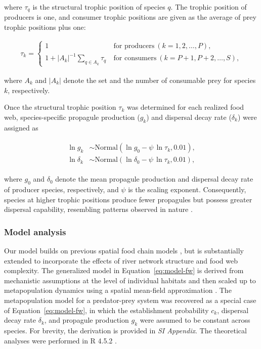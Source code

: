 \documentclass[11pt, class=article, crop=false]{standalone}
\theoremstyle{definition}
\begin{document}
where $\tau_q$ is the structural trophic position of species $q$.
The trophic position of producers is one, and
consumer trophic positions are given as the average of prey trophic positions plus one:

\begin{align}
    \tau_k = 
    \begin{cases}
    1 & ~\text{for producers}~ (k=1, 2, \ldots, P),\\
    1 + |A_{k}|^{-1} \sum_{q \in A_{k}} \tau_q & ~\text{for consumers}~ (k = P+1, P+2, \ldots, S),
    \end{cases}
\end{align}

where $A_{k}$ and $|A_{k}|$ denote the set and the number of consumable prey for species $k$, respectively.

Once the structural trophic position $\tau_k$ was determined for each realized food web, species-specific propagule production ($g_k$) and dispersal decay rate ($\delta_k$) were assigned as

\begin{align}
\begin{split}
    \ln g_k &\sim \mathrm{Normal}(\ln g_0 - \psi\, \ln \tau_k, 0.01),\\
    \ln \delta_k &\sim \mathrm{Normal}(\ln \delta_0 - \psi\,\ln \tau_k, 0.01),
\end{split}
\end{align}

where $g_0$ and $\delta_0$ denote the mean propagule production and dispersal decay rate of producer species, respectively, and $\psi$ is the scaling exponent.
Consequently, species at higher trophic positions produce fewer propagules but possess greater dispersal capability, resembling patterns observed in nature \citep{finlay_stream_2011, mccann_dynamics_2005}.

\subsubsection{Model analysis}

Our model builds on previous spatial food chain models \citep[e.g.,][]{holt_food_2002, takimoto_effects_2012, calcagno_constraints_2011, terui_spatial_2019}, but is substantially extended to incorporate the effects of river network structure and food web complexity. 
The generalized model in Equation~\ref{eq:model-fw} is derived from mechanistic assumptions at the level of individual habitats and then scaled up to metapopulation dynamics using a spatial mean-field approximation \citep{ovaskainen_asymptotically_2006}. 
The metapopulation model for a predator-prey system was recovered as a special case of Equation~\ref{eq:model-fw}, in which the establishment probability $c_k$, dispersal decay rate $\delta_k$, and propagule production $g_k$ were assumed to be constant across species.
For brevity, the derivation is provided in \textit{SI Appendix}.
The theoretical analyses were performed in R 4.5.2 \citep{r_program}.
\end{document}
